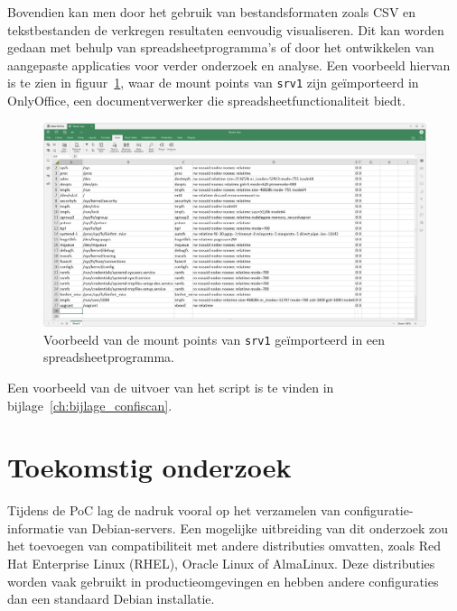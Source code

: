 Bovendien kan men door het gebruik van bestandsformaten zoals CSV en tekstbestanden de verkregen resultaten eenvoudig visualiseren.
Dit kan worden gedaan met behulp van spreadsheetprogramma's of door het ontwikkelen van aangepaste applicaties voor verder onderzoek en analyse.
Een voorbeeld hiervan is te zien in figuur~\ref{fig:mountpoints-csv-import-spreadsheet}, waar de mount points van \texttt{srv1} zijn ge\"importeerd in OnlyOffice, een documentverwerker die spreadsheetfunctionaliteit biedt.

\begin{figure}[h!]
    \begin{center}
        \includegraphics[width=\textwidth]
        {./graphics/mountpoints-csv-import-spreadsheet.png}
        \caption[Voorbeeld van mount points in spreadsheet.]{\label{fig:mountpoints-csv-import-spreadsheet}Voorbeeld van de mount points van \texttt{srv1} ge\"importeerd in een spreadsheetprogramma.}
    \end{center}
\end{figure}

Een voorbeeld van de uitvoer van het script is te vinden in bijlage~\ref{ch:bijlage_confiscan}.

\section{Toekomstig onderzoek}
\label{poc_toekomstig_onderzoek}

Tijdens de PoC lag de nadruk vooral op het verzamelen van configuratie-informatie van Debian-servers.
Een mogelijke uitbreiding van dit onderzoek zou het toevoegen van compatibiliteit met andere distributies omvatten, zoals Red Hat Enterprise Linux (RHEL), Oracle Linux of AlmaLinux.
Deze distributies worden vaak gebruikt in productieomgevingen en hebben andere configuraties dan een standaard Debian installatie.

